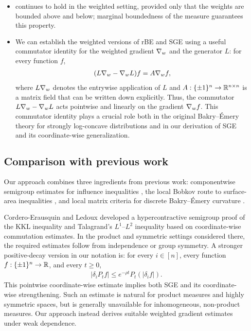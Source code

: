 \begin{itemize}
    \item {} continues to hold in the weighted setting, provided only that the weights are bounded above and below; marginal boundedness of the measure guarantees this property.
    \item We can establish the weighted versions of rBE and SGE using a useful commutator identity for the weighted gradient $\nabla_w$ and the generator $L$: for every function $f$,
    \begin{align*}
        (L\nabla_w - \nabla_w L) f = A \nabla_w f,
    \end{align*}
    where $L \nabla_w$ denotes the entrywise application of $L$ and $A: \{\pm 1\}^n \to \mathbb{R}^{n \times n}$ is a matrix field that can be written down explicitly. 
    Thus, the commutator $L\nabla_w - \nabla_w L$ acts pointwise and linearly on the gradient $\nabla_w f$. This commutator identity plays a crucial role both in the original Bakry--\'Emery theory for strongly log-concave distributions and in our derivation of SGE and its coordinate-wise generalization.
\end{itemize}


\subsection{Comparison with previous work}
\label{subsec:related-work}
Our approach combines three ingredients from previous work: componentwise semigroup estimates for influence inequalities \cite{CorderoErausquinLedoux12}, the local Bobkov route to surface-area inequalities \cite{IvanisviliZhang26}, and local matrix criteria for discrete Bakry--\'Emery curvature \cite{CKLP22}.

Cordero-Erausquin and Ledoux \cite{CorderoErausquinLedoux12} developed a hypercontractive semigroup proof of the KKL inequality and Talagrand's $L^1$--$L^2$ inequality based on coordinate-wise commutation estimates. In the product and symmetric settings considered there, the required estimates follow from independence or group symmetry. A stronger positive-decay version in our notation is: for every $i \in [n]$, every function $f: \{\pm 1\}^n \to \mathbb{R}$, and every $t\geq 0$,
\begin{align}\label{eq:CL-condition}
    |\delta_i P_t f| \le e^{-\rho t} P_t(|\delta_i f|).
\end{align}
This pointwise coordinate-wise estimate implies both SGE  and its coordinate-wise strengthening. Such an estimate is natural for product measures and highly symmetric spaces, but is generally unavailable for inhomogeneous, non-product measures. Our approach instead derives suitable weighted gradient estimates under weak dependence.

